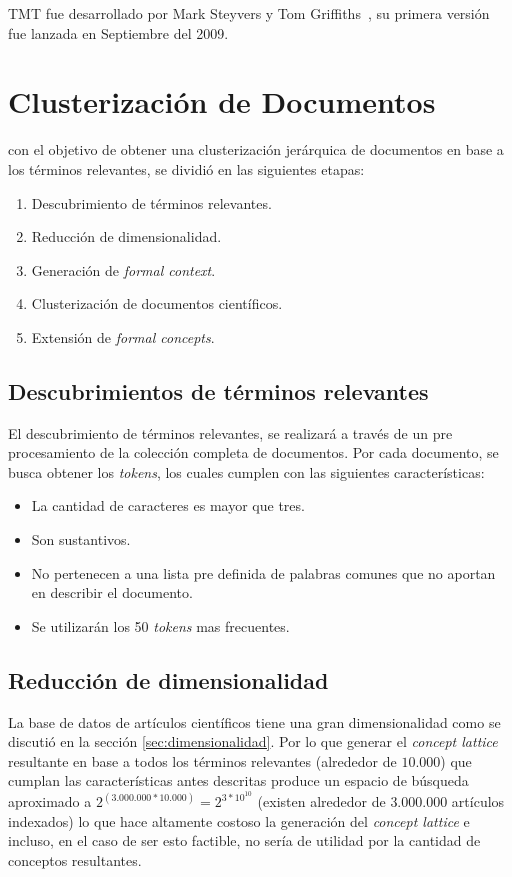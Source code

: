 \documentclass[12pt,oneside,letterpaper]{book}
\newcommand{\eng}[1]{\textit{#1}\xspace}			%
\newcommand{\abr}[1]{\textsc{#1}\xspace}           %
\theoremstyle{definition}
\begin{document}
\abr{TMT} fue desarrollado por Mark Steyvers y Tom Griffiths~\cite{matlabtoolbox}, su primera versión fue lanzada en Septiembre del 2009.

\section{Clusterización de Documentos}
\label{sec:clusterizacion_de_documentos}
con el objetivo de obtener una clusterización jerárquica de documentos en base a los términos relevantes, se dividió en las siguientes etapas:

\begin{enumerate}
	\item Descubrimiento de términos relevantes.
	\item Reducción de dimensionalidad.
	\item Generación de \eng{formal context}.
	\item Clusterización de documentos científicos.
	\item Extensión de \eng{formal concepts}.
\end{enumerate} 

\subsection{Descubrimientos de términos relevantes}
\label{sub:descubrimiento}
El descubrimiento de términos relevantes, se realizará a través de un pre procesamiento de la colección completa de documentos. Por cada documento, se busca obtener los \eng{tokens}, los cuales cumplen con las siguientes características:
\begin{itemize}
	\item La cantidad de caracteres es mayor que tres.
	\item Son sustantivos.
	\item No pertenecen a una lista pre definida de palabras comunes que no aportan en describir el documento.
	\item Se utilizarán los 50 \eng{tokens} mas frecuentes.
\end{itemize}


\subsection{Reducción de dimensionalidad}
\label{sub:reduccion_de_dimensionalidad}
La base de datos de artículos científicos tiene una gran dimensionalidad como se discutió en la sección \ref{sec:dimensionalidad}. Por lo que generar el \eng{concept lattice} resultante en base a todos los términos relevantes (alrededor de $10.000$) que cumplan las características antes descritas produce un espacio de búsqueda aproximado a $2^{(3.000.000*10.000)} = 2^{3*10^{10}}$ (existen alrededor de $3.000.000$ artículos indexados) lo que hace altamente costoso la generación del \eng{concept lattice} e incluso, en el caso de ser esto factible, no sería de utilidad por la cantidad de conceptos resultantes. 
\end{document}
